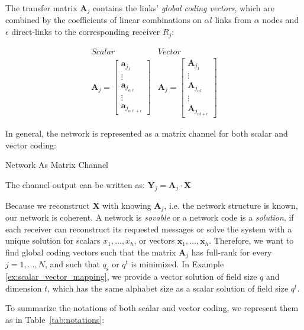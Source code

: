 The transfer matrix $\boldsymbol{A}_{j}$ contains the links' \textit{global
coding vectors}, which are combined by the coefficients of linear
combinations on $\alpha l$ links from $\alpha$ nodes and $\epsilon$
direct-links to the corresponding receiver $R_{j}$:

\[
\begin{array}{c|c}
Scalar & Vector\\
\boldsymbol{A}_{j}=\left[\begin{array}{c}
\boldsymbol{a}_{j_{1}}\\
\vdots\\
\boldsymbol{a}_{j_{\alpha\ell}}\\
\vdots\\
\boldsymbol{a}_{j_{\alpha\ell+\epsilon}}
\end{array}\right] & \boldsymbol{A}_{j}=\left[\begin{array}{c}
\boldsymbol{A}_{j_{1}}\\
\vdots\\
\boldsymbol{A}_{j_{\alpha l}}\\
\vdots\\
\boldsymbol{A}_{j_{\alpha l+\epsilon}}
\end{array}\right]
\end{array}
\]

In general, the network is represented as a matrix channel for both
scalar and vector coding:
\begin{defn}
Network As Matrix Channel

The channel output can be written as: $\boldsymbol{Y}_{j}=\boldsymbol{A}_{j}\cdot\boldsymbol{X}$
\end{defn}
Because we reconstruct $\boldsymbol{X}$ with knowing $\boldsymbol{A}_{j}$,
i.e. the network structure is known, our network is coherent. A network
is \textit{sovable} or a network code is a \textit{solution}, if each
receiver can reconstruct its requested messages or solve the system
with a unique solution for scalars $x_{1},\ldots,x_{h}$, or vectors
$\boldsymbol{x}_{1},\ldots,\boldsymbol{x}_{h}$. Therefore, we want
to find global coding vectors such that the matrix $\boldsymbol{A}_{j}$
has full-rank for every $j=1,\ldots,N$, and such that $q_{\mathrm{s}}$
or $q^{t}$ is minimized. In Example \ref{ex:scalar_vector_mapping},
we provide a vector solution of field size $q$ and dimension $t$,
which has the same alphabet size as a scalar solution of field size
$q^{t}$.

To summarize the notations of both scalar and vector coding, we represent
them as in Table~\ref{tab:notations}:

